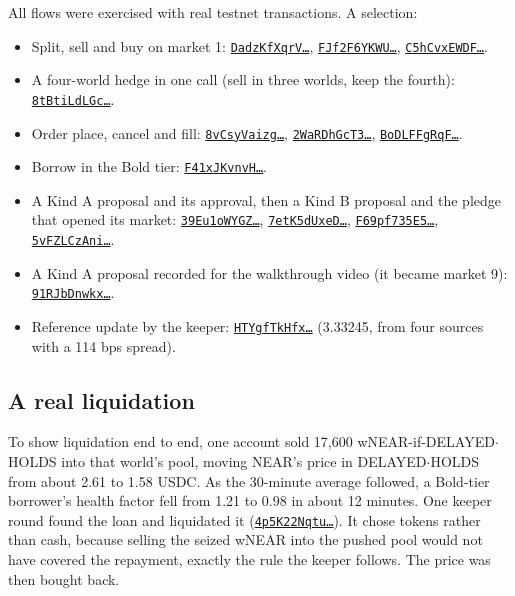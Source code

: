 \documentclass[11pt,a4paper]{article}
\newcommand{\wDH}{\textsf{DELAYED$\cdot$HOLDS}}
\newcommand{\code}[1]{\texttt{\small #1}}
\newcommand{\tx}[2]{\href{https://testnet.nearblocks.io/txns/#1}{\code{#2\ldots}}}
\begin{document}
All flows were exercised with real testnet transactions. A selection:
\begin{itemize}
\item Split, sell and buy on market 1: \tx{DadzKfXqrV613gPLeWdWn2CHNC196fueGW1GZJpTguj2}{DadzKfXqrV},
\tx{FJf2F6YKWUQuQmxjAcoHbkx3b9dZEpeY4MSxfVVvWJvz}{FJf2F6YKWU}, \tx{C5hCvxEWDFefWbcg6kmdgBqzuE2xBuXDVuvbZ27LUg7k}{C5hCvxEWDF}.
\item A four-world hedge in one call (sell in three worlds, keep the fourth):
\tx{8tBtiLdLGcA8UFwQRQ3Aiy5AbvYrujHuMHBQ2ZLqqQZD}{8tBtiLdLGc}.
\item Order place, cancel and fill: \tx{8vCsyVaizg5bTDT2y5bP1ttAeHK8YSfZMQtT2oBRJdF1}{8vCsyVaizg},
\tx{2WaRDhGcT3yvhdDfbbgWxrBD9EG7KNbHiRbVwrwmBcSW}{2WaRDhGcT3}, \tx{BoDLFFgRqFwYKV9cFMPaQ9krsqWnw9qp2bJowyP1zQN3}{BoDLFFgRqF}.
\item Borrow in the Bold tier: \tx{F41xJKvnvHndEC5EYAH2N5NXm3PwF8LL6Cf7mSrGWtpA}{F41xJKvnvH}.
\item A Kind A proposal and its approval, then a Kind B proposal and the pledge that opened its market:
\tx{39Eu1oWYGZHmj9pMJRsJhVuNenVjzeRLp1QUFXWfZVnz}{39Eu1oWYGZ}, \tx{7etK5dUxeD6hRCi2n9j1RhLDunZ9PUcKdx6xrdeSYkGp}{7etK5dUxeD},
\tx{F69pf735E5XLuRnzUJ8hggD5S6bG7AtMQ5b228qXPwZX}{F69pf735E5}, \tx{5vFZLCzAniB96gvVsudAY9WuMcKqk42ddxh8NXqAViAR}{5vFZLCzAni}.
\item A Kind A proposal recorded for the walkthrough video (it became market 9): \tx{91RJbDnwkxqhUjUYAyiA6Nz9LfgL9P4BcHwNjTSgwru}{91RJbDnwkx}.
\item Reference update by the keeper: \tx{HTYgfTkHfxvfAxxE5mGNQn5cNcJXAUashCB7b8Xk9cCc}{HTYgfTkHfx} (3.33245, from four sources
with a 114 bps spread).
\end{itemize}

\subsection{A real liquidation}

To show liquidation end to end, one account sold 17,600 wNEAR-if-\wDH{} into that world's pool, moving NEAR's price
in \wDH{} from about 2.61 to 1.58 USDC. As the 30-minute average followed, a Bold-tier borrower's health factor fell
from 1.21 to 0.98 in about 12 minutes. One keeper round found the loan and liquidated it
(\tx{4p5K22NqtujzJQXn9Gnxsrpa5s1KJG5Xh2NwEiJkwYVh}{4p5K22Nqtu}). It chose tokens rather than cash, because selling the seized
wNEAR into the pushed pool would not have covered the repayment, exactly the rule the keeper follows. The price was
then bought back.
\end{document}
